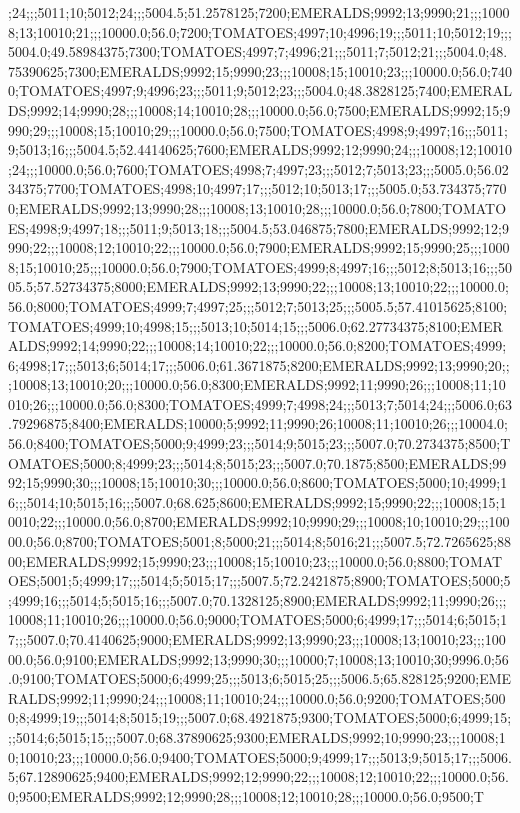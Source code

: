 ;24;;;5011;10;5012;24;;;5004.5;51.2578125;7200;EMERALDS;9992;13;9990;21;;;10008;13;10010;21;;;10000.0;56.0;7200;TOMATOES;4997;10;4996;19;;;5011;10;5012;19;;;5004.0;49.58984375;7300;TOMATOES;4997;7;4996;21;;;5011;7;5012;21;;;5004.0;48.75390625;7300;EMERALDS;9992;15;9990;23;;;10008;15;10010;23;;;10000.0;56.0;7400;TOMATOES;4997;9;4996;23;;;5011;9;5012;23;;;5004.0;48.3828125;7400;EMERALDS;9992;14;9990;28;;;10008;14;10010;28;;;10000.0;56.0;7500;EMERALDS;9992;15;9990;29;;;10008;15;10010;29;;;10000.0;56.0;7500;TOMATOES;4998;9;4997;16;;;5011;9;5013;16;;;5004.5;52.44140625;7600;EMERALDS;9992;12;9990;24;;;10008;12;10010;24;;;10000.0;56.0;7600;TOMATOES;4998;7;4997;23;;;5012;7;5013;23;;;5005.0;56.0234375;7700;TOMATOES;4998;10;4997;17;;;5012;10;5013;17;;;5005.0;53.734375;7700;EMERALDS;9992;13;9990;28;;;10008;13;10010;28;;;10000.0;56.0;7800;TOMATOES;4998;9;4997;18;;;5011;9;5013;18;;;5004.5;53.046875;7800;EMERALDS;9992;12;9990;22;;;10008;12;10010;22;;;10000.0;56.0;7900;EMERALDS;9992;15;9990;25;;;10008;15;10010;25;;;10000.0;56.0;7900;TOMATOES;4999;8;4997;16;;;5012;8;5013;16;;;5005.5;57.52734375;8000;EMERALDS;9992;13;9990;22;;;10008;13;10010;22;;;10000.0;56.0;8000;TOMATOES;4999;7;4997;25;;;5012;7;5013;25;;;5005.5;57.41015625;8100;TOMATOES;4999;10;4998;15;;;5013;10;5014;15;;;5006.0;62.27734375;8100;EMERALDS;9992;14;9990;22;;;10008;14;10010;22;;;10000.0;56.0;8200;TOMATOES;4999;6;4998;17;;;5013;6;5014;17;;;5006.0;61.3671875;8200;EMERALDS;9992;13;9990;20;;;10008;13;10010;20;;;10000.0;56.0;8300;EMERALDS;9992;11;9990;26;;;10008;11;10010;26;;;10000.0;56.0;8300;TOMATOES;4999;7;4998;24;;;5013;7;5014;24;;;5006.0;63.79296875;8400;EMERALDS;10000;5;9992;11;9990;26;10008;11;10010;26;;;10004.0;56.0;8400;TOMATOES;5000;9;4999;23;;;5014;9;5015;23;;;5007.0;70.2734375;8500;TOMATOES;5000;8;4999;23;;;5014;8;5015;23;;;5007.0;70.1875;8500;EMERALDS;9992;15;9990;30;;;10008;15;10010;30;;;10000.0;56.0;8600;TOMATOES;5000;10;4999;16;;;5014;10;5015;16;;;5007.0;68.625;8600;EMERALDS;9992;15;9990;22;;;10008;15;10010;22;;;10000.0;56.0;8700;EMERALDS;9992;10;9990;29;;;10008;10;10010;29;;;10000.0;56.0;8700;TOMATOES;5001;8;5000;21;;;5014;8;5016;21;;;5007.5;72.7265625;8800;EMERALDS;9992;15;9990;23;;;10008;15;10010;23;;;10000.0;56.0;8800;TOMATOES;5001;5;4999;17;;;5014;5;5015;17;;;5007.5;72.2421875;8900;TOMATOES;5000;5;4999;16;;;5014;5;5015;16;;;5007.0;70.1328125;8900;EMERALDS;9992;11;9990;26;;;10008;11;10010;26;;;10000.0;56.0;9000;TOMATOES;5000;6;4999;17;;;5014;6;5015;17;;;5007.0;70.4140625;9000;EMERALDS;9992;13;9990;23;;;10008;13;10010;23;;;10000.0;56.0;9100;EMERALDS;9992;13;9990;30;;;10000;7;10008;13;10010;30;9996.0;56.0;9100;TOMATOES;5000;6;4999;25;;;5013;6;5015;25;;;5006.5;65.828125;9200;EMERALDS;9992;11;9990;24;;;10008;11;10010;24;;;10000.0;56.0;9200;TOMATOES;5000;8;4999;19;;;5014;8;5015;19;;;5007.0;68.4921875;9300;TOMATOES;5000;6;4999;15;;;5014;6;5015;15;;;5007.0;68.37890625;9300;EMERALDS;9992;10;9990;23;;;10008;10;10010;23;;;10000.0;56.0;9400;TOMATOES;5000;9;4999;17;;;5013;9;5015;17;;;5006.5;67.12890625;9400;EMERALDS;9992;12;9990;22;;;10008;12;10010;22;;;10000.0;56.0;9500;EMERALDS;9992;12;9990;28;;;10008;12;10010;28;;;10000.0;56.0;9500;T